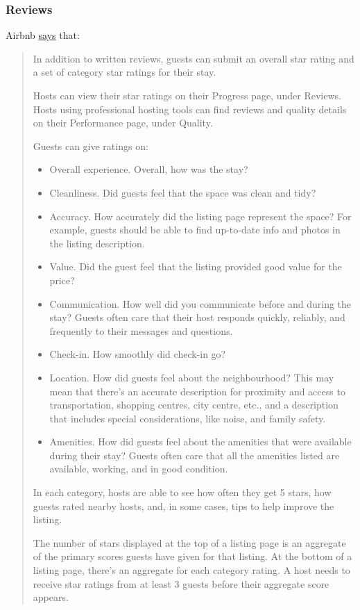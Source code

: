 \documentclass[
]{book}
\providecommand{\tightlist}{%
  \setlength{\itemsep}{0pt}\setlength{\parskip}{0pt}}
\begin{document}
\hypertarget{reviews}{%
\subsubsection{Reviews}\label{reviews}}

Airbnb \href{https://www.airbnb.ca/help/article/1257/how-do-star-ratings-work-for-stays}{says} that:

\begin{quote}
In addition to written reviews, guests can submit an overall star rating and a set of category star ratings for their stay.

Hosts can view their star ratings on their Progress page, under Reviews. Hosts using professional hosting tools can find reviews and quality details on their Performance page, under Quality.

Guests can give ratings on:

\begin{itemize}
\tightlist
\item
  Overall experience. Overall, how was the stay?
\item
  Cleanliness. Did guests feel that the space was clean and tidy?
\item
  Accuracy. How accurately did the listing page represent the space? For example, guests should be able to find up-to-date info and photos in the listing description.
\item
  Value. Did the guest feel that the listing provided good value for the price?
\item
  Communication. How well did you communicate before and during the stay? Guests often care that their host responds quickly, reliably, and frequently to their messages and questions.
\item
  Check-in. How smoothly did check-in go?
\item
  Location. How did guests feel about the neighbourhood? This may mean that there's an accurate description for proximity and access to transportation, shopping centres, city centre, etc., and a description that includes special considerations, like noise, and family safety.
\item
  Amenities. How did guests feel about the amenities that were available during their stay? Guests often care that all the amenities listed are available, working, and in good condition.
\end{itemize}

In each category, hosts are able to see how often they get 5 stars, how guests rated nearby hosts, and, in some cases, tips to help improve the listing.

The number of stars displayed at the top of a listing page is an aggregate of the primary scores guests have given for that listing. At the bottom of a listing page, there's an aggregate for each category rating. A host needs to receive star ratings from at least 3 guests before their aggregate score appears.
\end{quote}
\end{document}
